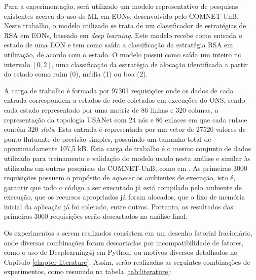 Para a experimentação, será utilizado um modelo representativo de pesquisas existentes acerca do uso de ML em EONs, desenvolvido pelo \acrfull{COMNET-UnB}. Neste trabalho, o modelo utilizado se trata de um classificador de estratégias de RSA em EONs, baseado em \textit{deep learning}. Este modelo recebe como entrada o estado de uma EON e tem como saída a classificação da estratégia RSA em utilização, de acordo com o estado. O modelo possui como saída um inteiro no intervalo $[0, 2]$, uma classificação da estratégia de alocação identificada a partir do estado como ruim (0), média (1) ou boa (2).

A carga de trabalho é formada por 97301 requisições onde os dados de cada entrada correspondem a estados de rede coletados em execuções do ONS, sendo cada estado representado por uma matriz de 86 linhas e 320 colunas, a representação da topologia USANet com 24 nós e 86 enlaces em que cada enlace contém 320 \textit{slots}. Esta entrada é representada por um vetor de 27520 valores de ponto flutuante de precisão simples, possuindo um tamanho total de aproximadamente 107,5 kB. Esta carga de trabalho é o mesmo conjunto de dados utilizado para treinamento e validação do modelo usado nesta análise e similar às utilizadas em outras pesquisas do \acrfull{COMNET-UnB}, como em \cite{eon_ml_classifier_2020}. As primeiras 3000 requisições possuem o propósito de \textit{aquecer} os ambientes de execução, isto é, garantir que todo o código a ser executado já está compilado pelo ambiente de execução, que os recursos apropriados já foram alocados, que o lixo de memória inicial da aplicação já foi coletado, entre outros. Portanto, os resultados das primeiras 3000 requisições serão descartados na análise final.

Os experimentos a serem realizados consistem em um desenho fatorial fracionário, onde diversas combinações foram descartadas por incompatibilidade de fatores, como o uso de Deeplearning4j em Python, ou motivos diversos detalhados no Capítulo \ref{chapter-literature}. Assim, serão realizadas as seguintes combinações de experimentos, como resumido na tabela \ref{tab:literature}:

